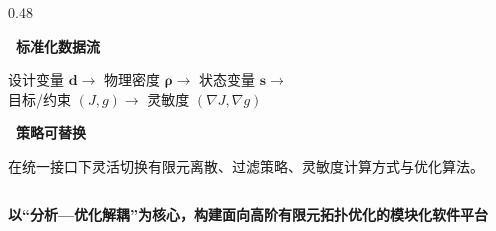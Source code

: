 \documentclass[notheorems]{beamer}
\begin{document}
\begin{frame}
\begin{columns}[t, totalwidth=\linewidth]
\begin{column}{0.48\linewidth}
\begin{tcolorbox}
{						\par\vspace{6pt}
						\textbf{~标准化数据流}\par
						\vspace{2pt}
						设计变量 $\boldsymbol{d}\!\to\!$ 物理密度 $\boldsymbol{\rho}\!\to\!$ 状态变量 $\mathbf{s}\!\to\!$\\ 
						目标/约束 $(J,g)\!\to\!$ 灵敏度 $(\nabla J,\nabla g)$
						
						\par\vspace{6pt}
						\textbf{~策略可替换}\par
						\vspace{2pt}
						在统一接口下灵活切换有限元离散、过滤策略、灵敏度计算方式与优化算法。
					}
				\end{tcolorbox}
			\end{column}
			
		\end{columns}
		
		\vspace{0.4em}
		
		\begin{tcolorbox}[
			colback=structure.fg, colframe=structure.fg,
			coltext=white, boxrule=0pt, arc=2pt,
			top=4pt, bottom=4pt, left=8pt, right=8pt,
			]
			\centering\fontsize{8}{11}\selectfont\sffamily\bfseries
			以“分析—优化解耦”为核心，构建面向高阶有限元拓扑优化的模块化软件平台
		\end{tcolorbox}
		
	\end{frame}
	
\end{document}
